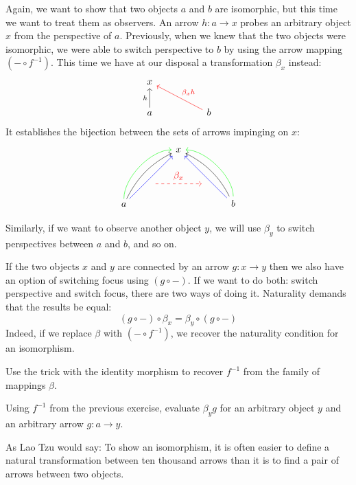 \documentclass[DaoFP]{subfiles}
\begin{document}
Again, we want to show that two objects $a$ and $b$ are isomorphic, but this time we want to treat them as observers. An arrow $h \colon a \to x$ probes an arbitrary object $x$ from the perspective of $a$. Previously, when we knew that the two objects were isomorphic, we were able to switch perspective to $b$ by using the arrow mapping $(- \circ f^{-1})$. This time we have at our disposal a transformation $\beta_x$ instead:
\[
 \begin{tikzcd}
 x
 \\
 a
\arrow[u, "h"]
 && b
  \arrow[llu, red, "\beta_x h"']
  \end{tikzcd}
\]
 It establishes the bijection between the sets of arrows impinging on $x$:
\[
 \begin{tikzcd}
 \node(x) at (0, 2) {x};
 \node(a) at (-2, 0) {a};
 \node(b) at (2, 0) {b};
 \node(c1) at (-1, 1.5) {};
 \node(c2) at (-1.5, 1) {};
 \node(c3) at (-1, 2) {};
 \node(c4) at (-2, 1) {};
 \node(d1) at (1, 1.5) {};
 \node(d2) at (1.5, 1) {};
 \node(d3) at (1, 2) {};
 \node(d4) at (2, 1) {};
\node (aa) at (-1, 0.75) {};
 \node (bb) at (1, 0.75) {};
 \draw[<-] (x) .. controls (c1)  and (c2) .. (a); %
 \draw[<-, green] (x) .. controls (c3)  and (c4) .. (a); %
 \draw[<-, blue] (x) -- (a); 
  \draw[<-] (x) .. controls (d1)  and (d2) .. (b); %
 \draw[<-, green] (x) .. controls (d3)  and (d4) .. (b); %
 \draw[<-, blue] (x) -- (b); 
 \draw[->, red, dashed] (aa) -- node[above]{\beta_x} (bb);
 \end{tikzcd}
\]

Similarly, if we want to observe another object $y$, we will use $\beta_y$ to switch perspectives between $a$ and $b$, and so on. 



If the two objects $x$ and $y$ are connected by an arrow $g \colon x \to y$ then we also have an option of switching focus using $(g \circ -)$. If we want to do both: switch perspective and switch focus, there are two ways of doing it. Naturality demands that the results be equal:
\[ (g \circ -) \circ \beta_x = \beta_y \circ (g \circ -) \]
Indeed, if we replace $\beta$ with $(- \circ f^{-1})$, we recover the naturality condition for an isomorphism. 

\begin{exercise}
Use the trick with the identity morphism to recover $f^{-1}$ from the family of mappings $\beta$.
\end{exercise}
\begin{exercise}
Using $f^{-1}$ from the previous exercise, evaluate $\beta_y g$ for an arbitrary object $y$ and an arbitrary arrow $g \colon a \to y$.
\end{exercise}


As Lao Tzu would say: To show an isomorphism, it is often easier to define a natural transformation between ten thousand arrows than it is to find a pair of arrows between two objects.
\end{document}
